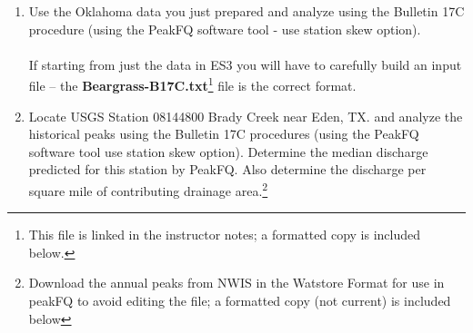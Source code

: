 \documentclass[12pt]{article}
\begin{document}
\begin{enumerate}
Use the data to:
\begin{enumerate}
\item Plot year versus stage ( x-axis is year).
\item Plot year versus discharge ( x-axis is year).
\item Plot the discharge versus stage.
\item Using the Weibull plotting position formula, determine the distribution parameters that fit the data for a log-normal distribution.
\item Using the Weibull plotting position formula, determine the distribution parameters that fit the data for a Gumbell distribution.
\item Using the Weibull plotting position formula, determine the distribution parameters that fit the data for a Gamma distribution.
\item Estimate the discharge associated with a 25-percent chance exceedence probability (i.e. the value that is equal to or exceeded with a 1 in 4 chance).
\item A resident claims that in the early 1900?s a flood corresponding to a stage of 30 feet occurred at the gage location.  Estimate the exceedence probability (return period) of the flow assicoated with this event.
\end{enumerate}
\clearpage

\item Use the Oklahoma data you just prepared and analyze using the Bulletin 17C procedure (using the PeakFQ software tool - use station skew option).   \\~\\ If starting from just the data in ES3 you will have to carefully build an input file -- the \textbf{Beargrass-B17C.txt}\footnote{This file is linked in the instructor notes; a formatted copy is included below.} file is the correct format. 

\item  Locate USGS Station 08144800 Brady Creek near Eden, TX. and analyze the historical peaks using the Bulletin 17C procedures (using the PeakFQ software tool use station skew option).  Determine the median discharge predicted for this station by PeakFQ.  Also determine the discharge per square mile of contributing drainage area.\footnote{Download the annual peaks from NWIS in the Watstore Format for use in peakFQ to avoid editing the file; a formatted copy (not current) is included below}

\end{enumerate}
\end{document}
